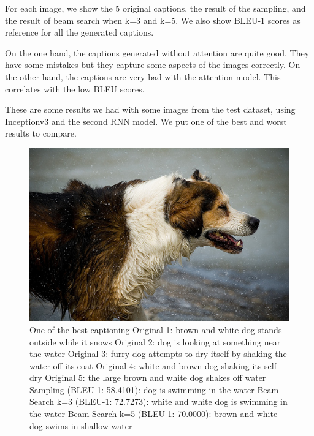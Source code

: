 \documentclass{article} %
\begin{document}
For each image, we show the 5 original captions, the result of the sampling, and the result of beam search when k=3 and k=5. We also show BLEU-1 scores as reference for all the generated captions.

On the one hand, the captions generated without attention are quite good. They have some mistakes but they capture some aspects of the images correctly. On the other hand, the captions are very bad with the attention model. This correlates with the low BLEU scores.

These are some results we had with some images from the test dataset, using Inceptionv3 and the second RNN model. We put one of the best and worst results to compare.


\begin{figure}[ht]
\centering
\includegraphics[scale=1]{dog.jpeg}
\caption{One of the best captioning\newline
Original 1: brown and white dog stands outside while it snows\newline
Original 2: dog is looking at something near the water\newline
Original 3: furry dog attempts to dry itself by shaking the water off its coat\newline
Original 4: white and brown dog shaking its self dry\newline
Original 5: the large brown and white dog shakes off water\newline
Sampling (BLEU-1: 58.4101): dog is swimming in the water\newline
Beam Search k=3 (BLEU-1: 72.7273): white and white dog is swimming in the water\newline
Beam Search k=5 (BLEU-1: 70.0000): brown and white dog swims in shallow water\newline}
\label{dog}
\end{figure}
\end{document}
